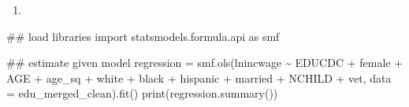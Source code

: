 \documentclass[
  letterpaper,
  DIV=11,
  numbers=noendperiod]{scrartcl}
\newenvironment{Shaded}{\begin{snugshade}}{\end{snugshade}}
\newcommand{\BuiltInTok}[1]{\textcolor[rgb]{0.00,0.23,0.31}{#1}}
\newcommand{\CommentTok}[1]{\textcolor[rgb]{0.37,0.37,0.37}{#1}}
\newcommand{\ImportTok}[1]{\textcolor[rgb]{0.00,0.46,0.62}{#1}}
\newcommand{\NormalTok}[1]{\textcolor[rgb]{0.00,0.23,0.31}{#1}}
\newcommand{\OperatorTok}[1]{\textcolor[rgb]{0.37,0.37,0.37}{#1}}
\newcommand{\StringTok}[1]{\textcolor[rgb]{0.13,0.47,0.30}{#1}}
\providecommand{\tightlist}{%
  \setlength{\itemsep}{0pt}\setlength{\parskip}{0pt}}\usepackage{longtable,booktabs,array}
\begin{document}
\begin{enumerate}
\def\labelenumi{\arabic{enumi}.}
\setcounter{enumi}{2}
\tightlist
\item
\end{enumerate}

\begin{Shaded}
\begin{Highlighting}[]
\CommentTok{\#\# load libraries}
\ImportTok{import}\NormalTok{ statsmodels.formula.api }\ImportTok{as}\NormalTok{ smf}

\CommentTok{\#\# estimate given model }
\NormalTok{regression }\OperatorTok{=}\NormalTok{ smf.ols(}\StringTok{\textquotesingle{}lnincwage \textasciitilde{} EDUCDC + female + AGE + age\_sq + white + black + hispanic + married + NCHILD + vet\textquotesingle{}}\NormalTok{, data }\OperatorTok{=}\NormalTok{ edu\_merged\_clean).fit()}
\BuiltInTok{print}\NormalTok{(regression.summary())}
\end{Highlighting}
\end{Shaded}
\end{document}
